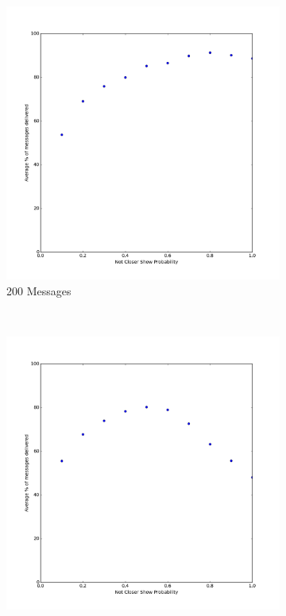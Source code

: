 \documentclass[bsc,frontabs,twoside,singlespacing,parskip,deptreport]{infthesis}     %
\begin{document}
\begin{figure}[h]
  	\vspace{-10pt}
    \centering
    \begin{subfigure}[b]{0.3\textwidth}
        \includegraphics[width=\textwidth]{results/notCloserProb_200messages}
        \caption{200 Messages}
        \label{fig:results/notCloserProb_200messages}
    \end{subfigure}
    ~ %
    \begin{subfigure}[b]{0.3\textwidth}
        \includegraphics[width=\textwidth]{results/notCloserProb_400messages}

\end{subfigure}
\end{figure}
\end{document}
